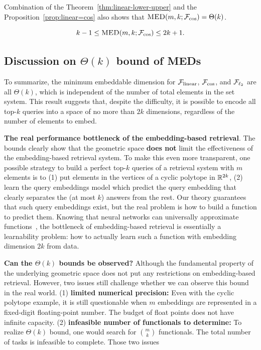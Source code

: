 \documentclass[10pt]{article}
\begin{document}
Combination of the Theorem~\ref{thm:linear-lower-upper} and the Proposition~\ref{prop:linear=cos} also shows that $\textsc{MED}(m, k; \mathcal{F}_{\cos}) = \Theta(k)$.

\begin{theorem}\label{thm:cos-lower-upper}
    $$k-1\leq \textsc{MED}(m, k; \mathcal{F}_{\cos}) \leq 2k+1.$$
\end{theorem}

\subsection{Discussion on $\Theta(k)$ bound of MEDs}
To summarize, the minimum embeddable dimension for $\mathcal{F}_{\rm linear}$, $\mathcal{F}_{\cos}$, and $\mathcal{F}_{\ell_{2}}$ are all $\Theta(k)$, which is independent of the number of total elements in the set system. This result suggests that, despite the difficulty, it is possible to encode all top-$k$ queries into a space of no more than $2k$ dimensions, regardless of the number of elements to embed.

\noindent\textbf{The real performance bottleneck of the embedding-based retrieval}. The bounds clearly show that the geometric space \textbf{does not} limit the effectiveness of the embedding-based retrieval system. To make this even more transparent, one possible strategy to build a perfect top-$k$ queries of a retrieval system with $m$ elements is to (1) put elements in the vertices of a cyclic polytope in $\mathbb{R}^{2k}$, (2) learn the query embeddings model which predict the query embedding that clearly separates the (at most $k$) answers from the rest. Our theory guarantees that such query embeddings exist, but the real problem is how to build a function to predict them. Knowing that neural networks can universally approximate functions~\cite {hornik1989multilayer}, the bottleneck of embedding-based retrieval is essentially a learnability problem: how to actually learn such a function with embedding dimension $2k$ from data.

\noindent\textbf{Can the $\Theta(k)$ bounds be observed?} Although the fundamental property of the underlying geometric space does not put any restrictions on embedding-based retrieval. However, two issues still challenge whether we can observe this bound in the real world. (1) \textbf{limited numerical precision:} Even with the cyclic polytope example, it is still questionable when $m$ embeddings are represented in a fixed-digit floating-point number. The budget of float points does not have infinite capacity. (2) \textbf{infeasible number of functionals to determine:} To realize $\Theta(k)$ bound, one would search for $\binom{m}{k}$ functionals. The total number of tasks is infeasible to complete. Those two issues 
\end{document}
